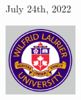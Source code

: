\documentclass[12pt]{report}
\begin{document}
\begin{titlepage}
	
	
	\vfill\vfill\vfill %
	
	{\large July 24th, 2022} %
	
	
	\vfill\vfill\vfill
	\includegraphics[width=0.2\textwidth]{laurier-crest-rev.jpg}\\[0.1cm] %
	 
	
	\vfill %
	
\end{titlepage}
\end{document}
